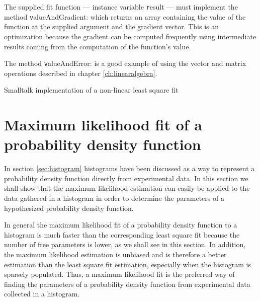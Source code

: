 The supplied fit function --- instance variable {\texttt result} ---
must implement the method {\texttt valueAndGradient:} which returns an
array containing the value of the function at the supplied
argument and the gradient vector. This is an optimization because
the gradient can be computed frequently using intermediate results
coming from the computation of the function's value.

The method {\texttt valueAndError:} is a good example of using the
vector and matrix operations described in chapter
\ref{ch:linearalgebra}.

\begin{listing} Smalltalk implementation of a non-linear
least square fit \label{ls:lsfnonlin}

\end{listing}

\section{Maximum likelihood fit of a probability density function}
\label{sec:mlfhist} In section \ref{sec:histogram} histograms have
been discussed as a way to represent a probability density
function directly from experimental data. In this section we shall
show that the maximum likelihood estimation can easily be applied
to the data gathered in a histogram in order to determine the
parameters of a hypothesized probability density function.

In general the maximum likelihood fit of a probability density
function to a histogram is much faster than the corresponding
least square fit because the number of free parameters is lower,
as we shall see in this section. In addition, the maximum
likelihood estimation is unbiased and is therefore a better
estimation than the least square fit estimation, especially when
the histogram is sparsely populated. Thus, a maximum likelihood
fit is the preferred way of finding the parameters of a
probability density function from experimental data collected in a
histogram.

